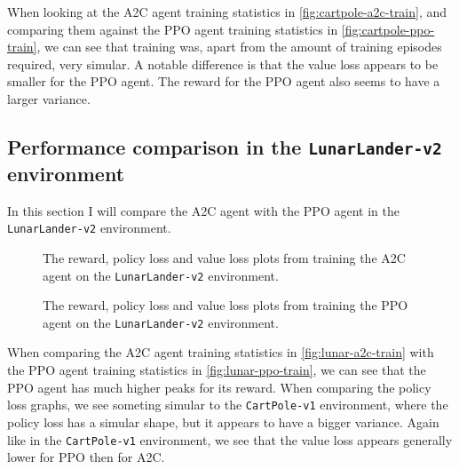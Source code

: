 \documentclass{article}
\begin{document}
   When looking at the A2C agent training statistics in 
   \autoref{fig:cartpole-a2c-train}, and comparing them against the PPO agent
   training statistics in \autoref{fig:cartpole-ppo-train}, we can see that
   training was, apart from the amount of training episodes required, very
   simular.  A notable difference is that the value loss appears to be smaller
   for the PPO agent.  The reward for the PPO agent also seems to have a larger
   variance.

  \subsection{Performance comparison in the \texttt{LunarLander-v2} environment}
   In this section I will compare the A2C agent with the PPO agent in the 
   \texttt{LunarLander-v2} environment.
 
   \begin{figure}[htbp]
    \centering
    \caption{The reward, policy loss and value loss plots from training the A2C
             agent on the \texttt{LunarLander-v2} environment.}
    \label{fig:lunar-a2c-train}
   \end{figure}

   \begin{figure}[htbp]
    \centering
    \caption{The reward, policy loss and value loss plots from training the PPO
             agent on the \texttt{LunarLander-v2} environment.}
    \label{fig:lunar-ppo-train}
   \end{figure}

   When comparing the A2C agent training statistics in 
   \autoref{fig:lunar-a2c-train} with the PPO agent training statistics in 
   \autoref{fig:lunar-ppo-train}, we can see that the PPO agent has much higher 
   peaks for its reward.  When comparing the policy loss graphs, we see 
   someting simular to the \texttt{CartPole-v1} environment, where the policy 
   loss has a simular shape, but it appears to have a bigger variance.  Again 
   like in the \texttt{CartPole-v1} environment, we see that the value loss 
   appears generally lower for PPO then for A2C.
\end{document}
